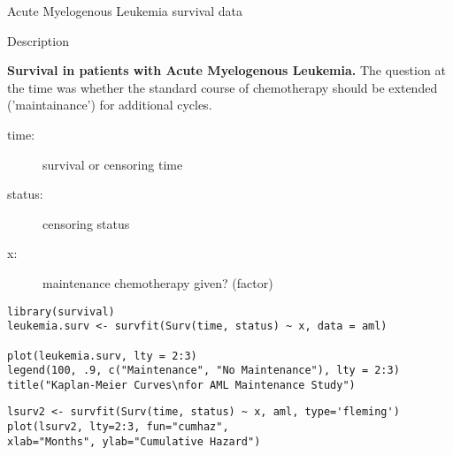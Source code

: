 Acute Myelogenous Leukemia survival data

Description

\textbf{Survival in patients with Acute Myelogenous Leukemia. }
The question at the time was whether the standard course of chemotherapy should be extended ('maintainance') for additional cycles.

\begin{description}
\item[time:]	survival or censoring time
\item[status:]	censoring status
\item[x:]	maintenance chemotherapy given? (factor)
\end{description}

\begin{framed}
\begin{verbatim}
library(survival)
leukemia.surv <- survfit(Surv(time, status) ~ x, data = aml) 

plot(leukemia.surv, lty = 2:3) 
legend(100, .9, c("Maintenance", "No Maintenance"), lty = 2:3) 
title("Kaplan-Meier Curves\nfor AML Maintenance Study") 
\end{verbatim}
\end{framed}



\begin{framed}
\begin{verbatim}
lsurv2 <- survfit(Surv(time, status) ~ x, aml, type='fleming') 
plot(lsurv2, lty=2:3, fun="cumhaz", 
xlab="Months", ylab="Cumulative Hazard") 
\end{verbatim}
\end{framed}


